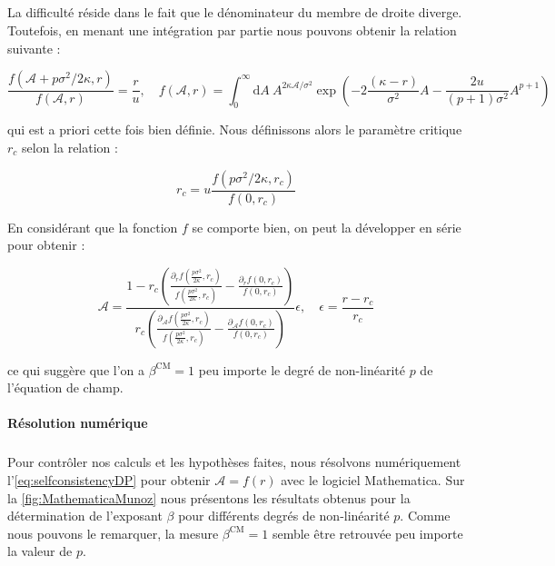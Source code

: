 \subparagraph{}La difficulté réside dans le fait que le dénominateur du membre de droite diverge. Toutefois, en menant une intégration par partie nous pouvons obtenir la relation suivante :

\begin{equation}
    \frac{f\left( \mathcal{A} + p\sigma^2/2\kappa, r \right)}{f\left(\mathcal{A}, r\right)}=\frac{r}{u},\quad f(\mathcal{A}, r) = \int_ 0^\infty \mathrm{d}A~A^{2\kappa\mathcal{A}/\sigma^2}\exp\left( -2\frac{(\kappa-r)}{\sigma^2} A - \frac{2u}{(p+1)\sigma^2}A^{p+1} \right)
    \label{eq:selfconsistencyDP}
\end{equation}

\noindent qui est a priori cette fois bien définie. Nous définissons alors le paramètre critique $r_c$ selon la relation :

\begin{equation}
    r_c = u\frac{f\left(p\sigma^2/2\kappa, r_c \right)}{f\left(0, r_c\right)}
\end{equation}

\noindent En considérant que la fonction $f$ se comporte bien, on peut la développer en série pour obtenir : 

\begin{equation}
    \mathcal{A} = \frac{1-r_c\left( \frac{\partial_r f(\frac{p\sigma^2}{2\kappa},r_c)}{f(\frac{p\sigma^2}{2\kappa},r_c)}- \frac{\partial_rf(0,r_c)}{f(0,r_c)} \right)}{r_c\left( \frac{\partial_\mathcal{A} f(\frac{p\sigma^2}{2\kappa},r_c)}{f(\frac{p\sigma^2}{2\kappa},r_c)}- \frac{\partial_\mathcal{A} f(0,r_c)}{f(0,r_c)} \right)}\epsilon,\quad \epsilon = \frac{r-r_c}{r_c}
\end{equation}

\noindent ce qui suggère que l'on a $\beta^\text{CM} = 1$ peu importe le degré de non-linéarité $p$ de l'équation de champ.

\paragraph{Résolution numérique}

\subparagraph{}Pour contrôler nos calculs et les hypothèses faites, nous résolvons numériquement l'\autoref{eq:selfconsistencyDP} pour obtenir $\mathcal{A} = f(r)$ avec le logiciel Mathematica. Sur la \autoref{fig:MathematicaMunoz} nous présentons les résultats obtenus pour la détermination de l'exposant $\beta$ pour différents degrés de non-linéarité $p$. Comme nous pouvons le remarquer, la mesure $\beta^\text{CM}=1$ semble être retrouvée peu importe la valeur de $p$.

